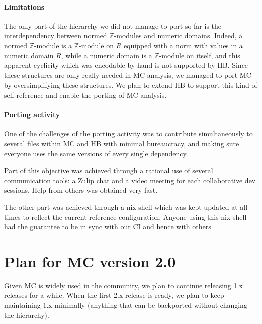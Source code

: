 \documentclass{easychair}
\def\MC{{\sf MC}}
\def\HB{{\sf HB}}
\begin{document}
\paragraph{Limitations}

The only part of the hierarchy we did not manage to port so far is the
interdependency between normed $\mathbb{Z}$-modules and numeric domains.
Indeed, a normed $\mathbb{Z}$-module is a $\mathbb{Z}$-module on $R$
equipped with a norm with values in a numeric domain $R$,
while a numeric domain is a $\mathbb{Z}$-module on itself, and this apparent
cyclicity which was encodable by hand is not supported by \HB{}.
Since these structures are only really needed in \MC{}-analysis,
we managed to port \MC{} by oversimplifying these structures.
We plan to extend \HB{} to support this kind of self-reference
and enable the porting of \MC{}-analysis.

\paragraph{Porting activity}

One of the challenges of the porting activity was to contribute simultaneously
to several files within \MC{} and \HB{} with minimal bureaucracy, and making sure
everyone uses the same versions of every single dependency.

Part of this objective was achieved through a rational use of several
communication tools: a Zulip chat and a video meeting for each
collaborative dev sessions. Help from others was obtained very fast.

The other part was achieved through a nix shell which was kept updated
at all times to reflect the current reference configuration.
Anyone using this nix-shell had the guarantee to be in sync with our CI
and hence with others

\section{Plan for \MC{} version 2.0}

Given \MC{} is widely used in the community, we plan to continue releasing 1.x
releases for a while. When the first 2.x release is ready, we plan to
keep maintaining 1.x minimally (anything that can be backported without changing the hierarchy).

\label{sect:bib}

%
%
%


\end{document}
